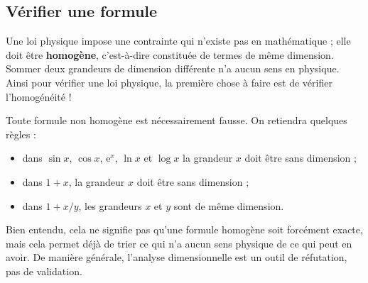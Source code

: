 \subsection{Vérifier une formule}
Une loi physique impose une contrainte qui n'existe pas en mathématique ; elle doit être \textbf{homogène}, c'est-à-dire constituée de termes de même dimension. Sommer deux grandeurs de dimension différente n'a aucun sens en physique. Ainsi pour vérifier une loi physique, la première chose à faire est de vérifier l'homogénéité !	
\begin{kaobox}[frametitle=Vérifier une formule]
	Toute formule non homogène est nécessairement fausse. On retiendra quelques règles :
\begin{itemize}
	\item dans $\sin x$, $\cos x$, $\mathrm{e}^x$, $\ln x$ et $\log x$ la grandeur $x$ doit être sans dimension ;
	\item dans $1+x$, la grandeur $x$ doit être sans dimension ;
	\item dans $1+x/y$, les grandeurs $x$ et $y$ sont de même dimension.
\end{itemize}
\end{kaobox}



Bien entendu, cela ne signifie pas qu'une formule homogène soit forcément exacte, mais cela permet déjà de trier ce qui n'a aucun sens physique de ce qui peut en avoir. De manière générale, l'analyse dimensionnelle est un outil de réfutation, pas de validation.

